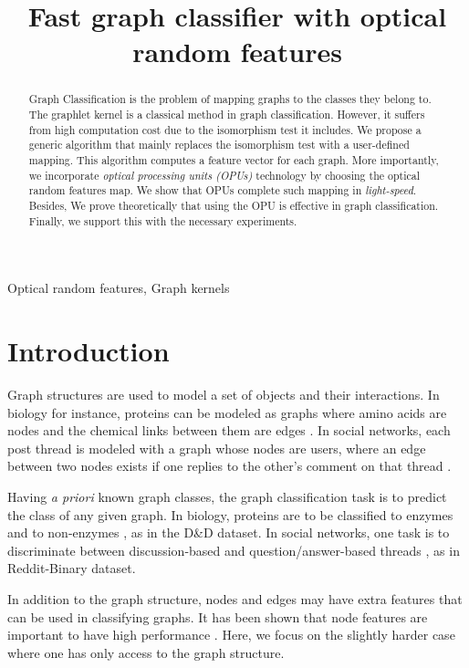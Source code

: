 \documentclass{article}
\title{Fast graph classifier with optical random features}
\begin{document}
%
\newtheorem{theorem}{Theorem} 
\maketitle
%
\begin{abstract}
Graph Classification is the problem of mapping graphs to the classes they belong to. The graphlet kernel is a classical method in graph classification. However, it suffers from high computation cost due to the isomorphism test it includes. We propose a generic algorithm that mainly replaces the isomorphism test with a user-defined mapping. 
This algorithm computes a feature vector for each graph. More importantly, we incorporate  \emph{optical processing units (OPUs)} technology by choosing the optical random features map. We show that OPUs complete  such mapping in \emph{ light-speed}. Besides, We prove theoretically that using the OPU is effective in graph classification. Finally, we support this with  the necessary experiments.

\end{abstract}
%
\begin{keywords}
Optical random features, Graph kernels
\end{keywords}
%
\section{Introduction}
\label{sec:intro}
Graph structures are used to model a set of objects and their interactions. In biology for instance,  proteins can be modeled as graphs where amino acids are nodes and the chemical links between them are edges \cite{protein_application}. In social networks, each post thread is modeled with a graph whose nodes are users, where an edge between two nodes exists if one replies to the other's comment on that thread \cite{graph_soc_net}.  

Having \emph{a priori} known graph classes, the graph classification task is to predict the class of any given graph. In biology,  proteins are to be classified to enzymes and to non-enzymes \cite{protein_application}, as in the D\&D dataset. In social networks, one task is to discriminate between discussion-based and question/answer-based threads \cite{class_Reddit}, as in Reddit-Binary dataset.

In addition to the graph structure, nodes and edges may have extra features that can be used in classifying graphs. It has been shown that node features are important to have high performance \cite{node_features}. Here, we focus on the slightly harder case where one has only access to the graph structure.
\end{document}
